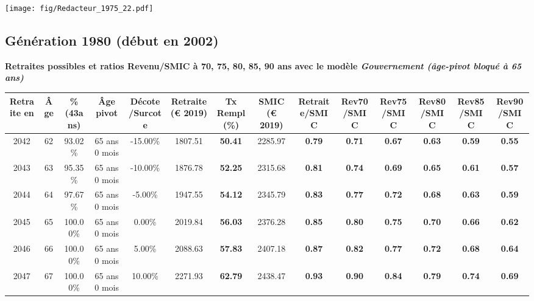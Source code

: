  \vspace{0.1cm} 

 \begin{center}\texttt{[image: fig/Redacteur\_1975\_22.pdf]}\end{center} \label{fig/Redacteur_1975_22.pdf} 

\newpage 
 
\subsection{Génération 1980 (début en 2002)} 

{\bf \noindent Retraites possibles et ratios Revenu/SMIC à 70, 75, 80, 85, 90 ans avec le modèle \emph{Gouvernement (âge-pivot bloqué à 65 ans)}}  
 
\begin{adjustbox}{max width=\textwidth} 
\begin{tabular}[htb]{|c|c||c|c|c||c|c||c||c|c|c|c|c|c|} 
\hline 
 Retraite en &  Âge &  \%(43ans) &  Âge pivot &  Décote/Surcote &  Retraite (\euro{} 2019) &  Tx Rempl(\%) &  SMIC (\euro{} 2019) &  Retraite/SMIC &  Rev70/SMIC &  Rev75/SMIC &  Rev80/SMIC &  Rev85/SMIC &  Rev90/SMIC \\ 
\hline \hline 
 2042 &  62 &  93.02\% &  65 ans 0 mois &  -15.00\% &  1807.51 &  {\bf 50.41} &  2285.97 &  {\bf {\color{red} 0.79}} &  {\bf {\color{red} 0.71}} &  {\bf {\color{red} 0.67}} &  {\bf {\color{red} 0.63}} &  {\bf {\color{red} 0.59}} &  {\bf {\color{red} 0.55}} \\ 
\hline 
 2043 &  63 &  95.35\% &  65 ans 0 mois &  -10.00\% &  1876.78 &  {\bf 52.25} &  2315.68 &  {\bf {\color{red} 0.81}} &  {\bf {\color{red} 0.74}} &  {\bf {\color{red} 0.69}} &  {\bf {\color{red} 0.65}} &  {\bf {\color{red} 0.61}} &  {\bf {\color{red} 0.57}} \\ 
\hline 
 2044 &  64 &  97.67\% &  65 ans 0 mois &  -5.00\% &  1947.55 &  {\bf 54.12} &  2345.79 &  {\bf {\color{red} 0.83}} &  {\bf {\color{red} 0.77}} &  {\bf {\color{red} 0.72}} &  {\bf {\color{red} 0.68}} &  {\bf {\color{red} 0.63}} &  {\bf {\color{red} 0.59}} \\ 
\hline 
 2045 &  65 &  100.00\% &  65 ans 0 mois &  0.00\% &  2019.84 &  {\bf 56.03} &  2376.28 &  {\bf {\color{red} 0.85}} &  {\bf {\color{red} 0.80}} &  {\bf {\color{red} 0.75}} &  {\bf {\color{red} 0.70}} &  {\bf {\color{red} 0.66}} &  {\bf {\color{red} 0.62}} \\ 
\hline 
 2046 &  66 &  100.00\% &  65 ans 0 mois &  5.00\% &  2088.63 &  {\bf 57.83} &  2407.18 &  {\bf {\color{red} 0.87}} &  {\bf {\color{red} 0.82}} &  {\bf {\color{red} 0.77}} &  {\bf {\color{red} 0.72}} &  {\bf {\color{red} 0.68}} &  {\bf {\color{red} 0.64}} \\ 
\hline 
 2047 &  67 &  100.00\% &  65 ans 0 mois &  10.00\% &  2271.93 &  {\bf 62.79} &  2438.47 &  {\bf {\color{red} 0.93}} &  {\bf {\color{red} 0.90}} &  {\bf {\color{red} 0.84}} &  {\bf {\color{red} 0.79}} &  {\bf {\color{red} 0.74}} &  {\bf {\color{red} 0.69}} \\ 
\hline 
\hline 
\end{tabular} 
\end{adjustbox} 
 
